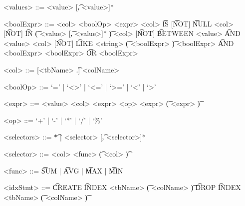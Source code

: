 \begin{grammar}
<values> ::= <value> [\t{,} <value>]*

<boolExpr> ::= <col> <boolOp> <expr>
\alt <col> \t{IS} [\t{NOT}] \t{NULL}
\alt <col> [\t{NOT}] \t{IN} \t{(} <value> [\t{,} <value>]* \t{)}
\alt <col> [\t{NOT}] \t{BETWEEN} <value> \t{AND} <value>
\alt <col> [\t{NOT}] \t{LIKE} <string>
\alt \t{(} <boolExpr> \t{)}
\alt <boolExpr> \t{AND} <boolExpr>
\alt <boolExpr> \t{OR} <boolExpr>

<col> ::= [<tbName> \t{.}] <colName>

<boolOp> ::= `=' | `<>' | `<=' | `>=' | `<' | `>'

<expr> ::= <value>
\alt <col>
\alt <expr> <op> <expr>
\alt \t{(} <expr> \t{)}

<op> ::= `+' | `-' | `*' | `/' | `\%'

<selectors> ::= \t{*} | <selector> [\t{,} <selector>]*

<selector> ::= <col>
\alt <func> \t{(} <col> \t{)}

<func> ::= \t{SUM} | \t{AVG} | \t{MAX} | \t{MIN}

<idxStmt> ::= \t{CREATE} \t{INDEX} <tbName> \t{(} <colName> \t{)}
\alt \t{DROP} \t{INDEX} <tbName> \t{(} <colName> \t{)}

\end{grammar}
